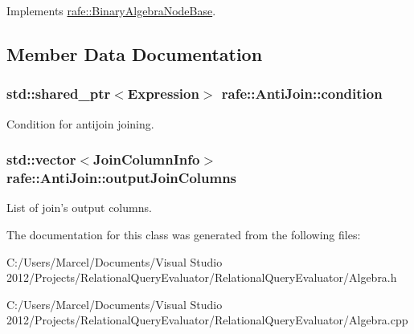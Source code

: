 Implements \hyperlink{classrafe_1_1_binary_algebra_node_base_a0c9c2fdbd7062bf0bf4587b9abc493b2}{rafe\+::\+Binary\+Algebra\+Node\+Base}.



\subsection{Member Data Documentation}
\hypertarget{classrafe_1_1_anti_join_a7eff7c54fb08dfefa4171080cd48fadc}{
\subsubsection[{condition}]{\setlength{\rightskip}{0pt plus 5cm}std\+::shared\+\_\+ptr$<${\bf Expression}$>$ rafe\+::\+Anti\+Join\+::condition}}\label{classrafe_1_1_anti_join_a7eff7c54fb08dfefa4171080cd48fadc}
Condition for antijoin joining. \hypertarget{classrafe_1_1_anti_join_a46d9e31d624610f99d6708fd5aee68be}{
\subsubsection[{output\+Join\+Columns}]{\setlength{\rightskip}{0pt plus 5cm}std\+::vector$<${\bf Join\+Column\+Info}$>$ rafe\+::\+Anti\+Join\+::output\+Join\+Columns}}\label{classrafe_1_1_anti_join_a46d9e31d624610f99d6708fd5aee68be}
List of join's output columns. 

The documentation for this class was generated from the following files\+:\begin{DoxyCompactItemize}
\item 
C\+:/\+Users/\+Marcel/\+Documents/\+Visual Studio 2012/\+Projects/\+Relational\+Query\+Evaluator/\+Relational\+Query\+Evaluator/Algebra.\+h\item 
C\+:/\+Users/\+Marcel/\+Documents/\+Visual Studio 2012/\+Projects/\+Relational\+Query\+Evaluator/\+Relational\+Query\+Evaluator/Algebra.\+cpp\end{DoxyCompactItemize}

